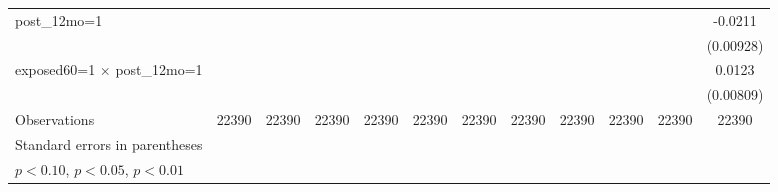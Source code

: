 \begin{table}[htbp]
\begin{tabular}{l*{11}{c}}
\addlinespace
post\_12mo=1         &                     &                     &                     &                     &                     &                     &                     &                     &                     &                     &     -0.0211\sym{*}  \\
                    &                     &                     &                     &                     &                     &                     &                     &                     &                     &                     &   (0.00928)         \\
\addlinespace
exposed60=1 $\times$ post\_12mo=1&                     &                     &                     &                     &                     &                     &                     &                     &                     &                     &      0.0123         \\
                    &                     &                     &                     &                     &                     &                     &                     &                     &                     &                     &   (0.00809)         \\
\midrule
Observations        &       22390         &       22390         &       22390         &       22390         &       22390         &       22390         &       22390         &       22390         &       22390         &       22390         &       22390         \\
\bottomrule
\multicolumn{12}{l}{\footnotesize Standard errors in parentheses}\\
\multicolumn{12}{l}{\footnotesize \sym{*} \(p<0.10\), \sym{**} \(p<0.05\), \sym{***} \(p<0.01\)}\\
\end{tabular}
\end{table}
